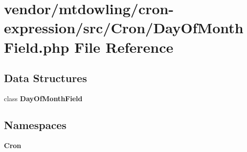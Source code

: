\section{vendor/mtdowling/cron-\/expression/src/\+Cron/\+Day\+Of\+Month\+Field.php File Reference}
\label{_day_of_month_field_8php}
\subsection*{Data Structures}
\begin{DoxyCompactItemize}
\item 
class {\bf Day\+Of\+Month\+Field}
\end{DoxyCompactItemize}
\subsection*{Namespaces}
\begin{DoxyCompactItemize}
\item 
 {\bf Cron}
\end{DoxyCompactItemize}
